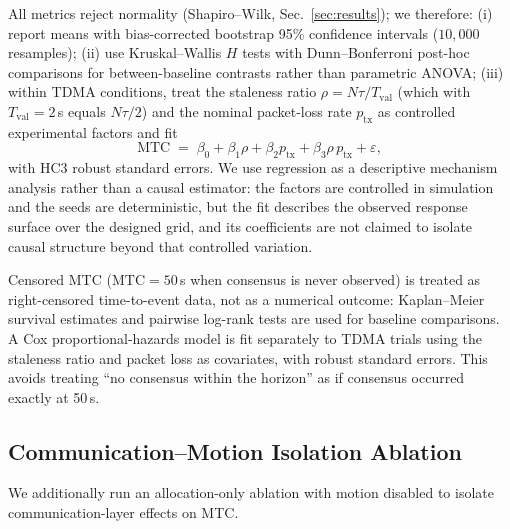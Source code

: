 All metrics reject normality (Shapiro--Wilk, Sec.~\ref{sec:results}); we therefore:
(i) report means with bias-corrected bootstrap 95\% confidence intervals ($10{,}000$ resamples);
(ii) use Kruskal--Wallis $H$ tests with Dunn--Bonferroni post-hoc comparisons for between-baseline contrasts rather than parametric ANOVA;
(iii) within TDMA conditions, treat the staleness ratio $\rho = N\tau/T_{\mathrm{val}}$ (which with $T_{\mathrm{val}} = 2$\,s equals $N\tau/2$) and the nominal packet-loss rate $p_{\mathrm{tx}}$ as controlled experimental factors and fit
\begin{equation}
\mathrm{MTC} \;=\; \beta_0 + \beta_1 \rho + \beta_2 p_{\mathrm{tx}} + \beta_3 \rho\, p_{\mathrm{tx}} + \varepsilon,
\label{eq:regression}
\end{equation}
with HC3 robust standard errors. We use regression as a descriptive mechanism analysis rather than a causal estimator: the factors are controlled in simulation and the seeds are deterministic, but the fit describes the observed response surface over the designed grid, and its coefficients are not claimed to isolate causal structure beyond that controlled variation.

Censored MTC ($\mathrm{MTC} = 50$\,s when consensus is never observed) is treated as right-censored time-to-event data, not as a numerical outcome: Kaplan--Meier survival estimates and pairwise log-rank tests are used for baseline comparisons. A Cox proportional-hazards model is fit separately to TDMA trials using the staleness ratio and packet loss as covariates, with robust standard errors. This avoids treating ``no consensus within the horizon'' as if consensus occurred exactly at 50\,s.

\subsection{Communication--Motion Isolation Ablation}\label{sec:setup-ablation}
We additionally run an allocation-only ablation with motion disabled to isolate communication-layer effects on MTC.